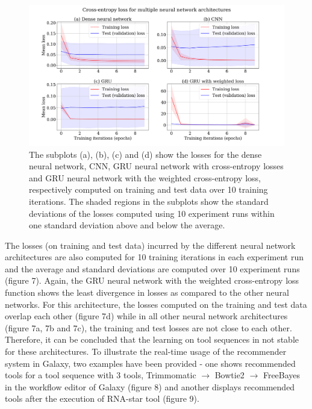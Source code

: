 \documentclass{bioinfo}
\begin{document}
\begin{figure}
\centerline{\includegraphics[scale=0.19]{bioinformatics_journal/images/loss.png}} \caption{The subplots (a), (b), (c) and (d) show the losses for the dense neural network, CNN, GRU neural network with cross-entropy losses and GRU neural network with the weighted cross-entropy loss, respectively computed on training and test data over 10 training iterations. The shaded regions in the subplots show the standard deviations of the losses computed using 10 experiment runs within one standard deviation above and below the average.}\label{figure:04}
\end{figure}

The losses (on training and test data) incurred by the different neural network architectures are also computed for 10 training iterations in each experiment run and the average and standard deviations are computed over 10 experiment runs (figure 7). Again, the GRU neural network with the weighted cross-entropy loss function shows the least divergence in losses as compared to the other neural networks. For this architecture, the losses computed on the training and test data overlap each other (figure 7d) while in all other neural network architectures (figure 7a, 7b and 7c), the training and test losses are not close to each other. Therefore, it can be concluded that the learning on tool sequences in not stable for these architectures. To illustrate the real-time usage of the recommender system in Galaxy, two examples have been provided - one shows recommended tools for a tool sequence with 3 tools, Trimmomatic $\rightarrow$ Bowtie2 $\rightarrow$ FreeBayes in the workflow editor of Galaxy (figure 8) and another displays recommended tools after the execution of RNA-star tool (figure 9).
\end{document}
